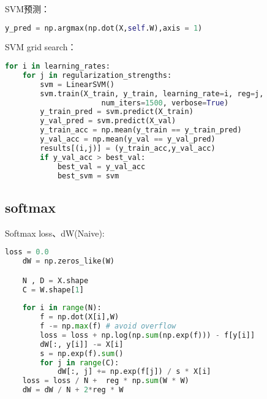 \documentclass[a4paper]{article}
\begin{document}
SVM预测：
\begin{lstlisting}[language=Python, caption=SVM预测]
    y_pred = np.argmax(np.dot(X,self.W),axis = 1)
\end{lstlisting}

SVM grid search：
\begin{lstlisting}[language=Python, caption=SVM grid search]
    for i in learning_rates:
    for j in regularization_strengths:
        svm = LinearSVM()
        svm.train(X_train, y_train, learning_rate=i, reg=j,
                      num_iters=1500, verbose=True)
        y_train_pred = svm.predict(X_train) 
        y_val_pred = svm.predict(X_val)
        y_train_acc = np.mean(y_train == y_train_pred)
        y_val_acc = np.mean(y_val == y_val_pred)
        results[(i,j)] = (y_train_acc,y_val_acc)
        if y_val_acc > best_val:
            best_val = y_val_acc
            best_svm = svm
\end{lstlisting}

\subsection{softmax}

Softmax loss、dW(Naive):
\begin{lstlisting}[language=Python, caption=Softmax(Naive)]
    loss = 0.0
    dW = np.zeros_like(W)

    N , D = X.shape
    C = W.shape[1]
    
    for i in range(N):
        f = np.dot(X[i],W)
        f -= np.max(f) # avoid overflow
        loss = loss + np.log(np.sum(np.exp(f))) - f[y[i]]
        dW[:, y[i]] -= X[i]
        s = np.exp(f).sum()
        for j in range(C):
            dW[:, j] += np.exp(f[j]) / s * X[i]
    loss = loss / N +  reg * np.sum(W * W)
    dW = dW / N + 2*reg * W
\end{lstlisting}
\end{document}
